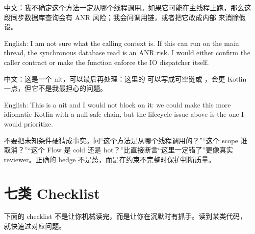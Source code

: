 \begin{sayit}[表达不确定]
中文：我不确定这个方法一定从哪个线程调用。如果它可能在主线程上跑，那么这段同步数据库查询会有 ANR 风险；我会问调用链，或者把它改成内部  来消除假设。\par
English: I am not sure what the calling context is. If this can run on the main thread, the synchronous database read is an ANR risk. I would either confirm the caller contract or make the function enforce the IO dispatcher itself.
\end{sayit}

\begin{sayit}[软化风格意见]
中文：这是一个 nit，可以最后再处理：这里的  可以写成可空链或 ，会更 Kotlin 一点，但它不是我最担心的问题。\par
English: This is a nit and I would not block on it: we could make this more idiomatic Kotlin with a null-safe chain, but the lifecycle issue above is the one I would prioritize.
\end{sayit}

\begin{idea}
不要把未知条件硬猜成事实。问“这个方法是从哪个线程调用的？”“这个 scope 谁取消？”“这个 Flow 是 cold 还是 hot？”比直接断言“这里一定错了”更像真实 reviewer。正确的 hedge 不是怂，而是在约束不完整时保护判断质量。
\end{idea}

\section{七类 Checklist}

下面的 checklist 不是让你机械读完，而是让你在沉默时有抓手。读到某类代码，就快速过对应问题。

